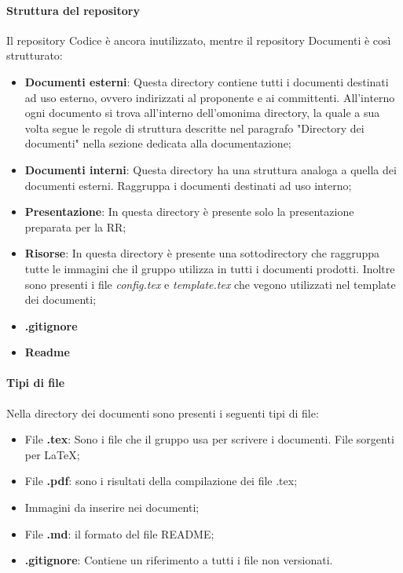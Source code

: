 \documentclass[../norme_di_progetto.tex]{subfiles}
\begin{document}
\paragraph{Struttura del repository}
Il repository Codice è ancora inutilizzato, mentre il repository Documenti è così strutturato:
\begin{itemize}
    \item \textbf{Documenti esterni}: Questa directory contiene tutti i documenti destinati ad uso esterno, ovvero indirizzati al proponente e ai committenti. All'interno ogni documento si trova all'interno dell'omonima directory, la quale a sua volta segue le regole di struttura descritte nel paragrafo "Directory dei documenti" nella sezione dedicata alla documentazione;
    \item \textbf{Documenti interni}: Questa directory ha una struttura analoga a quella dei documenti esterni. Raggruppa i documenti destinati ad uso interno;
    \item \textbf{Presentazione}: In questa directory è presente solo la presentazione preparata per la RR;
    \item \textbf{Risorse}: In questa directory è presente una sottodirectory che raggruppa tutte le immagini che il gruppo utilizza in tutti i documenti prodotti. Inoltre sono presenti i file \emph{config.tex} e \emph{template.tex} che vegono utilizzati nel template dei documenti;
    \item \textbf{.gitignore}
    \item \textbf{Readme}
\end{itemize}

\paragraph{Tipi di file}
Nella directory dei documenti sono presenti i seguenti tipi di file:
\begin{itemize}
    \item File \textbf{.tex}: Sono i file che il gruppo usa per scrivere i documenti. File sorgenti per \LaTeX;
    \item File \textbf{.pdf}: sono i risultati della compilazione dei file .tex;
    \item Immagini da inserire nei documenti;
    \item File \textbf{.md}: il formato del file README;
    \item \textbf{.gitignore}: Contiene un riferimento a tutti i file non versionati.
\end{itemize}
\end{document}
